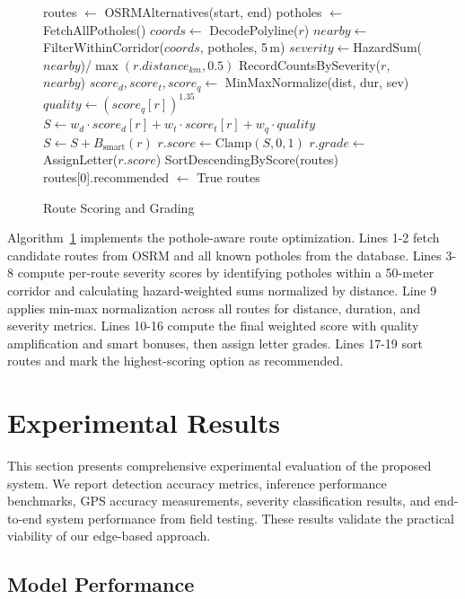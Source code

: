 \documentclass{ieeeaccess}
\begin{document}
\begin{figure}[t]
\centering
\begin{algorithm}[H]
\caption{Route Scoring and Grading}
\label{alg:route_scoring}
\begin{algorithmic}[1]
\State routes $\gets$ OSRMAlternatives(start, end)
\State potholes $\gets$ FetchAllPotholes()
  \State $coords \gets$ DecodePolyline($r$)
  \State $nearby \gets$ FilterWithinCorridor($coords$, potholes, 5\,m)
  \State $severity \gets$HazardSum($nearby$)/$\max(r.distance_{km}, 0.5)$
  \State RecordCountsBySeverity($r$, $nearby$)
\EndFor
\State $score_d, score_t, score_q \gets$ MinMaxNormalize(dist, dur, sev)
  \State $quality \gets (score_q[r])^{1.35}$
  \State $S \gets w_d \cdot score_d[r] + w_t \cdot score_t[r] + w_q \cdot quality$
  \State $S \gets S + B_{\text{smart}}(r)$
  \State $r.score \gets \text{Clamp}(S, 0, 1)$
  \State $r.grade \gets$ AssignLetter($r.score$)
\EndFor
\State SortDescendingByScore(routes)
\State routes[0].recommended $\gets$ True
\State \Return routes
\end{algorithmic}
\end{algorithm}
\end{figure}

Algorithm~\ref{alg:route_scoring} implements the pothole-aware route optimization. Lines 1-2 fetch candidate routes from OSRM and all known potholes from the database. Lines 3-8 compute per-route severity scores by identifying potholes within a 50-meter corridor and calculating hazard-weighted sums normalized by distance. Line 9 applies min-max normalization across all routes for distance, duration, and severity metrics. Lines 10-16 compute the final weighted score with quality amplification and smart bonuses, then assign letter grades. Lines 17-19 sort routes and mark the highest-scoring option as recommended.

\section{Experimental Results}

This section presents comprehensive experimental evaluation of the proposed system. We report detection accuracy metrics, inference performance benchmarks, GPS accuracy measurements, severity classification results, and end-to-end system performance from field testing. These results validate the practical viability of our edge-based approach.

\subsection{Model Performance}
\end{document}
